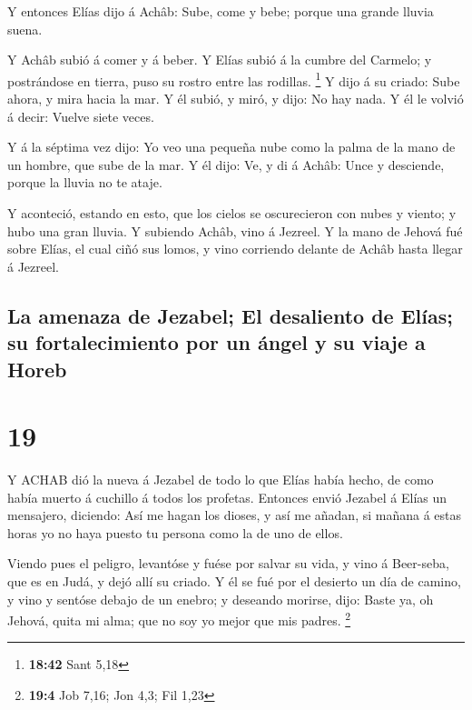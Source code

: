  Y entonces Elías dijo á Achâb: Sube, come y bebe; porque
una grande lluvia suena.

 Y Achâb subió á comer y á beber. Y Elías subió á la cumbre
del Carmelo; y postrándose en tierra, puso su rostro entre las rodillas.
\footnote{\textbf{18:42} Sant 5,18}  Y dijo á su criado:
Sube ahora, y mira hacia la mar. Y él subió, y miró, y dijo: No hay
nada. Y él le volvió á decir: Vuelve siete veces.

 Y á la séptima vez dijo: Yo veo una pequeña nube como la
palma de la mano de un hombre, que sube de la mar. Y él dijo: Ve, y di á
Achâb: Unce y desciende, porque la lluvia no te ataje.

 Y aconteció, estando en esto, que los cielos se
oscurecieron con nubes y viento; y hubo una gran lluvia. Y subiendo
Achâb, vino á Jezreel.  Y la mano de Jehová fué sobre
Elías, el cual ciñó sus lomos, y vino corriendo delante de Achâb hasta
llegar á Jezreel.

\hypertarget{la-amenaza-de-jezabel-el-desaliento-de-eluxedas-su-fortalecimiento-por-un-uxe1ngel-y-su-viaje-a-horeb}{%
\subsection{La amenaza de Jezabel; El desaliento de Elías; su
fortalecimiento por un ángel y su viaje a
Horeb}\label{la-amenaza-de-jezabel-el-desaliento-de-eluxedas-su-fortalecimiento-por-un-uxe1ngel-y-su-viaje-a-horeb}}

\hypertarget{section-18}{%
\section{19}\label{section-18}}

 Y ACHAB dió la nueva á Jezabel de todo lo que Elías había
hecho, de como había muerto á cuchillo á todos los profetas.
 Entonces envió Jezabel á Elías un mensajero, diciendo: Así
me hagan los dioses, y así me añadan, si mañana á estas horas yo no haya
puesto tu persona como la de uno de ellos.

 Viendo pues el peligro, levantóse y fuése por salvar su
vida, y vino á Beer-seba, que es en Judá, y dejó allí su criado.
 Y él se fué por el desierto un día de camino, y vino y
sentóse debajo de un enebro; y deseando morirse, dijo: Baste ya, oh
Jehová, quita mi alma; que no soy yo mejor que mis padres. \footnote{\textbf{19:4}
  Job 7,16; Jon 4,3; Fil 1,23}

